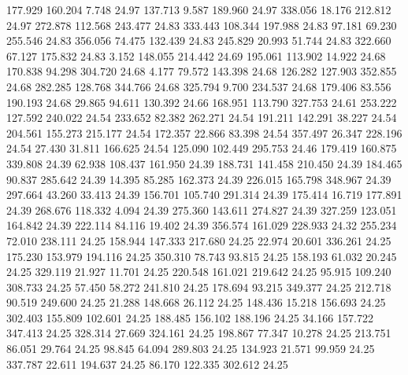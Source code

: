  177.929  160.204    7.748        24.97
 137.713    9.587  189.960        24.97
 338.056   18.176  212.812        24.97
 272.878  112.568  243.477        24.83
 333.443  108.344  197.988        24.83
  97.181   69.230  255.546        24.83
 356.056   74.475  132.439        24.83
 245.829   20.993   51.744        24.83
 322.660   67.127  175.832        24.83
   3.152  148.055  214.442        24.69
 195.061  113.902   14.922        24.68
 170.838   94.298  304.720        24.68
   4.177   79.572  143.398        24.68
 126.282  127.903  352.855        24.68
 282.285  128.768  344.766        24.68
 325.794    9.700  234.537        24.68
 179.406   83.556  190.193        24.68
  29.865   94.611  130.392        24.66
 168.951  113.790  327.753        24.61
 253.222  127.592  240.022        24.54
 233.652   82.382  262.271        24.54
 191.211  142.291   38.227        24.54
 204.561  155.273  215.177        24.54
 172.357   22.866   83.398        24.54
 357.497   26.347  228.196        24.54
  27.430   31.811  166.625        24.54
 125.090  102.449  295.753        24.46
 179.419  160.875  339.808        24.39
  62.938  108.437  161.950        24.39
 188.731  141.458  210.450        24.39
 184.465   90.837  285.642        24.39
  14.395   85.285  162.373        24.39
 226.015  165.798  348.967        24.39
 297.664   43.260   33.413        24.39
 156.701  105.740  291.314        24.39
 175.414   16.719  177.891        24.39
 268.676  118.332    4.094        24.39
 275.360  143.611  274.827        24.39
 327.259  123.051  164.842        24.39
 222.114   84.116   19.402        24.39
 356.574  161.029  228.933        24.32
 255.234   72.010  238.111        24.25
 158.944  147.333  217.680        24.25
  22.974   20.601  336.261        24.25
 175.230  153.979  194.116        24.25
 350.310   78.743   93.815        24.25
 158.193   61.032   20.245        24.25
 329.119   21.927   11.701        24.25
 220.548  161.021  219.642        24.25
  95.915  109.240  308.733        24.25
  57.450   58.272  241.810        24.25
 178.694   93.215  349.377        24.25
 212.718   90.519  249.600        24.25
  21.288  148.668   26.112        24.25
 148.436   15.218  156.693        24.25
 302.403  155.809  102.601        24.25
 188.485  156.102  188.196        24.25
  34.166  157.722  347.413        24.25
 328.314   27.669  324.161        24.25
 198.867   77.347   10.278        24.25
 213.751   86.051   29.764        24.25
  98.845   64.094  289.803        24.25
 134.923   21.571   99.959        24.25
 337.787   22.611  194.637        24.25
  86.170  122.335  302.612        24.25
